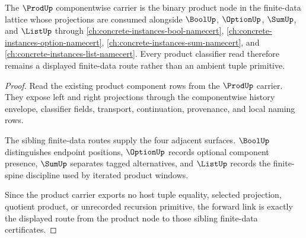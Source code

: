 \begin{theorem}
\label{thm:prod-bool-option-sibling-forward-link}
The $\ProdUp$ componentwise carrier is the binary product node in the finite-data lattice whose projections are consumed alongside $\BoolUp$, $\OptionUp$, $\SumUp$, and $\ListUp$ through \autoref{ch:concrete-instances-bool-namecert}, \autoref{ch:concrete-instances-option-namecert}, \autoref{ch:concrete-instances-sum-namecert}, and \autoref{ch:concrete-instances-list-namecert}. Every product classifier read therefore remains a displayed finite-data route rather than an ambient tuple primitive.
\end{theorem}
\begin{proof}
Read the existing product component rows from the $\ProdUp$ carrier. They expose left and right projections through the componentwise history envelope, classifier fields, transport, continuation, provenance, and local naming rows.

The sibling finite-data routes supply the four adjacent surfaces. $\BoolUp$ distinguishes endpoint positions, $\OptionUp$ records optional component presence, $\SumUp$ separates tagged alternatives, and $\ListUp$ records the finite-spine discipline used by iterated product windows.

Since the product carrier exports no host tuple equality, selected projection, quotient product, or unrecorded recursion primitive, the forward link is exactly the displayed route from the product node to those sibling finite-data certificates.
\end{proof}
